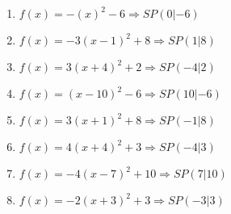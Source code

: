 \documentclass{article}%
\begin{document}
\begin{enumerate}[label=\alph*)]
\item%
\newline\vspace{0.5cm}$f(x)=-(x)^2 -6 \Rightarrow SP(0|-6) $%
\item%
\newline\vspace{0.5cm}$f(x)=-3(x-1)^2 +8 \Rightarrow SP(1|8) $%
\item%
\newline\vspace{0.5cm}$f(x)=3(x+4)^2 +2 \Rightarrow SP(-4|2) $%
\item%
\newline\vspace{0.5cm}$f(x)=(x-10)^2 -6 \Rightarrow SP(10|-6) $%
\item%
\newline\vspace{0.5cm}$f(x)=3(x+1)^2 +8 \Rightarrow SP(-1|8) $%
\item%
\newline\vspace{0.5cm}$f(x)=4(x+4)^2 +3 \Rightarrow SP(-4|3) $%
\item%
\newline\vspace{0.5cm}$f(x)=-4(x-7)^2 +10 \Rightarrow SP(7|10) $%
\item%
\newline\vspace{0.5cm}$f(x)=-2(x+3)^2 +3 \Rightarrow SP(-3|3) $%
\end{enumerate}

%
\end{document}
